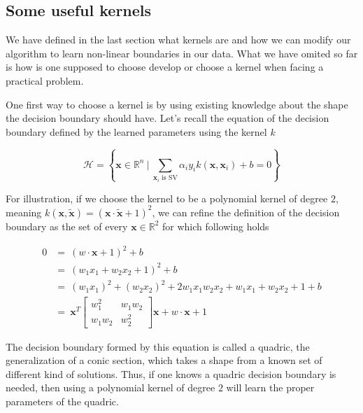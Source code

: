 \subsection {Some useful kernels}

We have defined in the last section what kernels are and how we can modify our algorithm to learn non-linear boundaries in our data. What we have omited so far is how is one supposed to choose develop or choose a kernel when facing a practical problem.

One first way to choose a kernel is by using existing knowledge about the shape the decision boundary should have. Let's recall the equation of the decision boundary defined by the learned parameters using the kernel $k$

\begin{equation*}
  \mathscr{H} = \left\{\mathbf{x} \in \mathbb{R}^n\ |\ \sum_{\mathbf{x}_i \text{ is SV}}\alpha_iy_ik\left(\mathbf{x}, \mathbf{x}_i\right) + b = 0\right\}
\end{equation*}

For illustration, if we choose the kernel to be a polynomial kernel of degree $2$, meaning $k\left(\mathbf{x}, \mathbf{\tilde{x}}\right) = \left(\mathbf{x} \cdot \mathbf{\tilde{x}} + 1\right)^2$, we can refine the definition of the decision boundary as the set of every $\mathbf{x} \in \mathbb{R}^2$ for which following holds

\begin{equation*}
  \begin{aligned}
    0 &=\ \left(w \cdot \mathbf{x} + 1\right)^2 + b\\
      &=\ \left(w_1x_1 + w_2x_2 + 1\right)^2 + b\\
      &=\ (w_1x_1)^2 + (w_2x_2)^2 + 2w_1x_1w_2x_2 + w_1x_1 + w_2x_2 + 1 + b\\
      &=\ \mathbf{x}^T\begin{bmatrix}w_1^2 & w_1w_2\\ w_1w_2 & w_2^2\end{bmatrix}\mathbf{x} + w \cdot \mathbf{x} + 1 
  \end{aligned}
\end{equation*}

The decision boundary formed by this equation is called a quadric, the generalization of a conic section, which takes a shape from a known set of different kind of solutions. Thus, if one knows a quadric decision boundary is needed, then using a polynomial kernel of degree $2$ will learn the proper parameters of the quadric.

